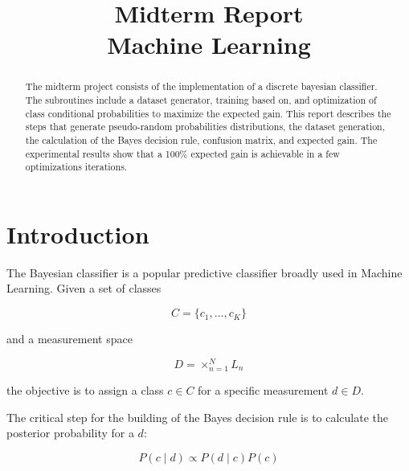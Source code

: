 \documentclass[letterpaper, conference]{IEEEtran}
\begin{document}
\title{Midterm Report \\
  \large Machine Learning}

\author{
}

\maketitle

\begin{abstract}

The midterm project consists of the implementation of a discrete bayesian classifier. The subroutines include a dataset generator, training based on, and optimization of class conditional probabilities to maximize the expected gain. This report describes the steps that generate pseudo-random probabilities distributions, the dataset generation, the calculation of the Bayes decision rule, confusion matrix, and expected gain. The experimental results show that a 100\% expected gain is achievable in a few optimizations iterations.

\end{abstract}

\section{Introduction}

The Bayesian classifier is a popular predictive classifier broadly used in Machine Learning. Given a set of classes

\begin{equation} \label{classes}
C = \{c_1, ..., c_K\}
\end{equation}

and a measurement space

\begin{equation} \label{dimensions}
D = \times_{n=1}^{N}L_n
\end{equation}

the objective is to assign a class $c \in C$ for a specific measurement $d \in D$.

The critical step for the building of the Bayes decision rule is to calculate the posterior probability for a $d$:

\begin{equation} \label{eq:bayes}
P(c \mid d) \propto P(d \mid c) P(c)
\end{equation}
\end{document}
